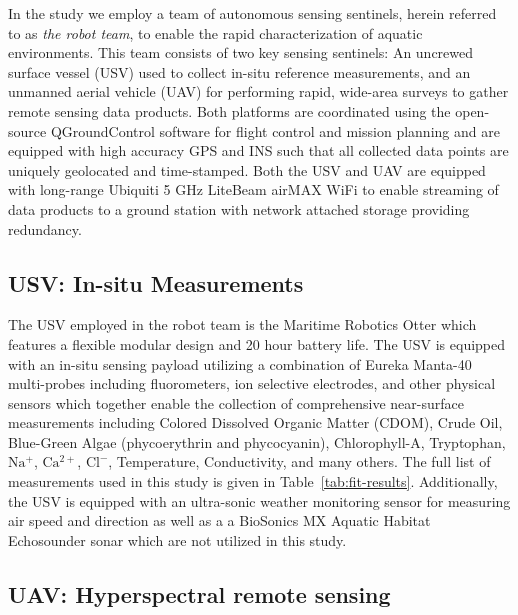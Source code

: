 \documentclass[journal,article,submit,pdftex,moreauthors]{Definitions/mdpi}
\begin{document}
In the study we employ a team of autonomous sensing sentinels, herein referred to as \textit{the robot team}, to enable the rapid characterization of aquatic environments. This team consists of two key sensing sentinels: An uncrewed surface vessel (USV) used to collect in-situ reference measurements, and an unmanned aerial vehicle (UAV) for performing rapid, wide-area surveys to gather remote sensing data products. Both platforms are coordinated using the open-source QGroundControl software for flight control and mission planning \cite{qgroundcontrol} and are equipped with high accuracy GPS and INS such that all collected data points are uniquely geolocated and time-stamped. Both the USV and UAV are equipped with long-range Ubiquiti 5 GHz LiteBeam airMAX WiFi to enable streaming of data products to a ground station with network attached storage providing redundancy.

\subsection{USV: In-situ Measurements}

The USV employed in the robot team is the Maritime Robotics Otter which features a flexible modular design and 20 hour battery life. The USV is equipped with an in-situ sensing payload utilizing a combination of Eureka Manta-40 multi-probes including fluorometers, ion selective electrodes, and other physical sensors which together enable the collection of comprehensive near-surface measurements including Colored Dissolved Organic Matter (CDOM), Crude Oil, Blue-Green Algae (phycoerythrin and phycocyanin), Chlorophyll-A, Tryptophan, $\mathrm{Na^+}$, $\mathrm{Ca^{2+}}$, $\mathrm{Cl^-}$, Temperature, Conductivity, and many others. The full list of measurements used in this study is given in Table~\ref{tab:fit-results}. Additionally, the USV is equipped with an ultra-sonic weather monitoring sensor for measuring air speed and direction as well as a a BioSonics MX Aquatic Habitat Echosounder sonar which are not utilized in this study.

\subsection{UAV: Hyperspectral remote sensing}
\end{document}
